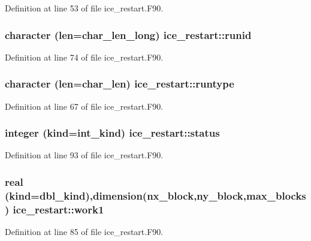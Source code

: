 Definition at line 53 of file ice\_\-restart.F90.\hypertarget{namespaceice__restart_a7f22ff2f3f9c3ccf57b19309c46deb79}{
\subsubsection[{runid}]{\setlength{\rightskip}{0pt plus 5cm}character (len=char\_\-len\_\-long) {\bf ice\_\-restart::runid}}}
\label{namespaceice__restart_a7f22ff2f3f9c3ccf57b19309c46deb79}


Definition at line 74 of file ice\_\-restart.F90.\hypertarget{namespaceice__restart_a549fe78d0644ff3e150fb73b66c04f1d}{
\subsubsection[{runtype}]{\setlength{\rightskip}{0pt plus 5cm}character (len=char\_\-len) {\bf ice\_\-restart::runtype}}}
\label{namespaceice__restart_a549fe78d0644ff3e150fb73b66c04f1d}


Definition at line 67 of file ice\_\-restart.F90.\hypertarget{namespaceice__restart_ae323f5dd85b87df694fafe6e4f453e70}{
\subsubsection[{status}]{\setlength{\rightskip}{0pt plus 5cm}integer (kind=int\_\-kind) {\bf ice\_\-restart::status}}}
\label{namespaceice__restart_ae323f5dd85b87df694fafe6e4f453e70}


Definition at line 93 of file ice\_\-restart.F90.\hypertarget{namespaceice__restart_a1703b86ac88cd5909cf72e10e6ff140f}{
\subsubsection[{work1}]{\setlength{\rightskip}{0pt plus 5cm}real (kind=dbl\_\-kind),dimension(nx\_\-block,ny\_\-block,max\_\-blocks) {\bf ice\_\-restart::work1}}}
\label{namespaceice__restart_a1703b86ac88cd5909cf72e10e6ff140f}


Definition at line 85 of file ice\_\-restart.F90.